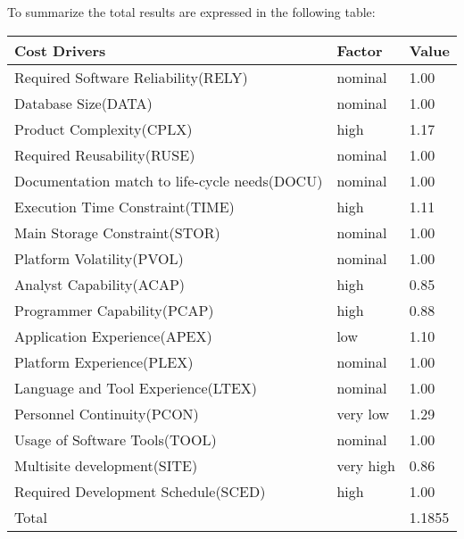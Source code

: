 To summarize the total results are expressed in the following table:
\begin{longtable}{| m{9 cm}| m{3 cm} | m{3 cm} | }
\hline
\textbf{Cost Drivers} & \textbf{Factor} & \textbf{Value} \\
\hline
Required Software Reliability(RELY) & nominal & 1.00 \\
\hline
Database Size(DATA) & nominal & 1.00 \\
\hline
Product Complexity(CPLX) & high & 1.17 \\
\hline
Required Reusability(RUSE) & nominal & 1.00 \\
\hline
Documentation match to life-cycle needs(DOCU) & nominal & 1.00 \\
\hline
Execution Time Constraint(TIME) & high & 1.11 \\
\hline
Main Storage Constraint(STOR) & nominal & 1.00 \\
\hline
Platform Volatility(PVOL) & nominal & 1.00 \\
\hline
Analyst Capability(ACAP) & high & 0.85 \\
\hline
Programmer Capability(PCAP) & high & 0.88 \\
\hline
Application Experience(APEX) & low & 1.10 \\
\hline
Platform Experience(PLEX) & nominal & 1.00 \\
\hline
Language and Tool Experience(LTEX) & nominal & 1.00 \\
\hline
Personnel Continuity(PCON) & very low & 1.29 \\
\hline
Usage of Software Tools(TOOL) & nominal & 1.00 \\
\hline
Multisite development(SITE) & very high & 0.86 \\
\hline
Required Development Schedule(SCED) & high & 1.00 \\
\hline
\multicolumn{2}{l}{Total} & 1.1855\\
\hline
\end{longtable}